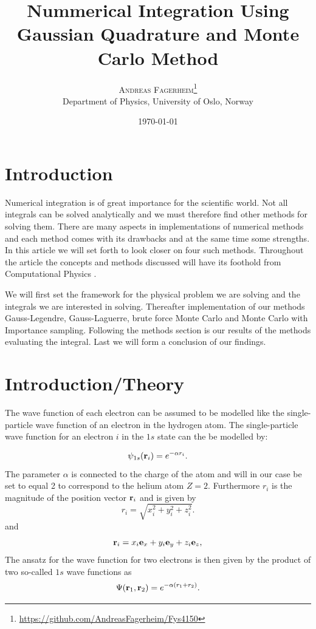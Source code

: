 \documentclass[twoside,twocolumn]{article}
\title{Nummerical Integration Using Gaussian Quadrature and Monte Carlo Method } %
\author{%
\textsc{Andreas Fagerheim}\thanks{\url{https://github.com/AndreasFagerheim/Fys4150}} \\[1ex] %
\normalsize Department of Physics, University of Oslo, Norway \\ %
}
\date{\today} %
\begin{document}
\maketitle


\section{Introduction}
Numerical integration is of great importance for the scientific world. Not all integrals can be solved analytically and we must therefore find other methods for solving them. There are many aspects in implementations of numerical methods and each method comes with its drawbacks and at the same time some strengths. In this article we will set forth to look closer on four such methods. Throughout the article the concepts and methods discussed will have its foothold from Computational Physics \cite{Hjorth-Jensen:2015dg}.

We will first set the framework for the physical problem we are solving and the integrals we are interested in solving. Thereafter implementation of our methods Gauss-Legendre, Gauss-Laguerre, brute force Monte Carlo and Monte Carlo with Importance sampling. Following the methods section is our results of the methods evaluating the integral. Last we will form a conclusion of our findings.
\section{Introduction/Theory}

The wave function of each electron can be assumed to be modelled like
the single-particle wave function of an electron in the hydrogen
atom. The single-particle wave function for an electron $i$ in the
$1s$ state can the be modelled by:



\begin{equation}
		\psi_{1s}({\bf r}_i)  =   e^{-\alpha r_i}.
\end{equation}
The parameter $\alpha$ is connected to the charge of the atom and will in our case be set to equal 2 to correspond to the helium atom $Z = 2$. Furthermore $r_i$ is the magnitude of the position vector ${\bf r}_i$ and is given by
\[
r_i = \sqrt{x_i^2+y_i^2+z_i^2}.
\]
and
\[
   {\bf r}_i =  x_i {\bf e}_x + y_i {\bf e}_y +z_i {\bf e}_z ,
\]
The ansatz for the wave function for two electrons is then given by the product of two 
so-called 
$1s$ wave functions as 
\[
   \Psi({\bf r}_1,{\bf r}_2)  =   e^{-\alpha (r_1+r_2)}.
\]
\end{document}
